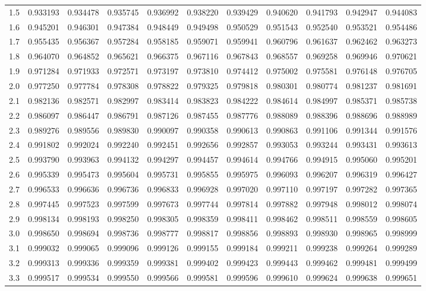 \documentclass[12pt, a4paper]{article}
\begin{document}
\begin{center}
\begin{tabular}{lllllllllll}
1.5& 0.933193&0.934478&0.935745&0.936992&0.938220&0.939429&0.940620&0.941793&0.942947&0.944083 \\
1.6& 0.945201&0.946301&0.947384&0.948449&0.949498&0.950529&0.951543&0.952540&0.953521&0.954486 \\
1.7& 0.955435&0.956367&0.957284&0.958185&0.959071&0.959941&0.960796&0.961637&0.962462&0.963273 \\
1.8& 0.964070&0.964852&0.965621&0.966375&0.967116&0.967843&0.968557&0.969258&0.969946&0.970621 \\
1.9& 0.971284&0.971933&0.972571&0.973197&0.973810&0.974412&0.975002&0.975581&0.976148&0.976705 \\
2.0& 0.977250&0.977784&0.978308&0.978822&0.979325&0.979818&0.980301&0.980774&0.981237&0.981691 \\
2.1& 0.982136&0.982571&0.982997&0.983414&0.983823&0.984222&0.984614&0.984997&0.985371&0.985738 \\
2.2& 0.986097&0.986447&0.986791&0.987126&0.987455&0.987776&0.988089&0.988396&0.988696&0.988989 \\
2.3& 0.989276&0.989556&0.989830&0.990097&0.990358&0.990613&0.990863&0.991106&0.991344&0.991576 \\
2.4& 0.991802&0.992024&0.992240&0.992451&0.992656&0.992857&0.993053&0.993244&0.993431&0.993613 \\
2.5& 0.993790&0.993963&0.994132&0.994297&0.994457&0.994614&0.994766&0.994915&0.995060&0.995201 \\
2.6& 0.995339&0.995473&0.995604&0.995731&0.995855&0.995975&0.996093&0.996207&0.996319&0.996427 \\
2.7& 0.996533&0.996636&0.996736&0.996833&0.996928&0.997020&0.997110&0.997197&0.997282&0.997365 \\
2.8& 0.997445&0.997523&0.997599&0.997673&0.997744&0.997814&0.997882&0.997948&0.998012&0.998074 \\
2.9& 0.998134&0.998193&0.998250&0.998305&0.998359&0.998411&0.998462&0.998511&0.998559&0.998605 \\
3.0& 0.998650&0.998694&0.998736&0.998777&0.998817&0.998856&0.998893&0.998930&0.998965&0.998999 \\
3.1& 0.999032&0.999065&0.999096&0.999126&0.999155&0.999184&0.999211&0.999238&0.999264&0.999289 \\
3.2& 0.999313&0.999336&0.999359&0.999381&0.999402&0.999423&0.999443&0.999462&0.999481&0.999499 \\
3.3& 0.999517&0.999534&0.999550&0.999566&0.999581&0.999596&0.999610&0.999624&0.999638&0.999651 \\

\end{tabular}
\end{center}
\end{document}
